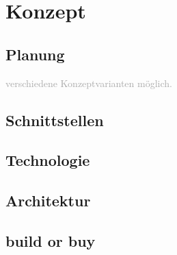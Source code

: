 \chapter{Konzept}
\label{sec:konzept}

\section{Planung}
\textcolor{darkgray} {
	verschiedene Konzeptvarianten möglich.
}
\section{Schnittstellen}
\section{Technologie}
\section{Architektur}
\section{build or buy}